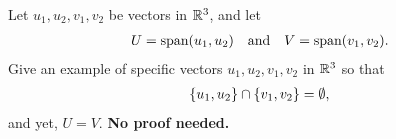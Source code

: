 \begin{question}
    \normalfont
    Let $u_1, u_2, v_1, v_2$ be vectors in ${\mathbb R}^3$, and let
    \begin{align*}
        U=\textnormal{span}(u_1,u_2)\ \ \ \textup{and} \ \ \
        V=\textnormal{span}(v_1,v_2).
    \end{align*}
    Give an example of specific vectors $u_1, u_2, v_1, v_2$ in ${\mathbb R}^3$ so that
    \begin{align*}
        \{u_1, u_2\}\cap \{ v_1, v_2 \} = \emptyset,
    \end{align*}
    and yet, $U=V$.  \textbf{No proof needed.}


\end{question}